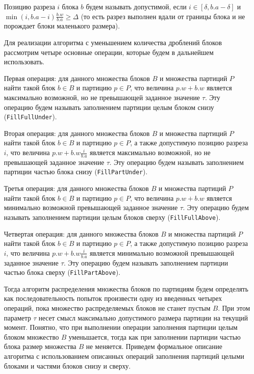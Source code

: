 \begin{definition}
Позицию разреза $i$ блока $b$ будем называть допустимой, если $i \in [\delta, b.a - \delta]$ и $\min(i, b.a - i)\frac{b.w}{b.a} \ge \Delta$ (то есть разрез выполнен вдали от границы блока и не порождает блоки маленького размера).
\end{definition}

Для реализации алгоритма с уменьшением количества дроблений блоков рассмотрим четыре основные операции, которые будем в дальнейшем использовать.

Первая операция: для данного множества блоков $B$ и множества партиций $P$ найти такой блок $b \in B$ и партицию $p \in P$, что величина $p.w + b.w$ является максимально возможной, но не превышающей заданное значение $\tau$.
Эту операцию будем называть заполнением партиции целым блоком снизу (\texttt{FillFullUnder}).

Вторая операция: для данного множества блоков $B$ и множества партиций $P$ найти такой блок $b \in B$ и партицию $p \in P$, а также допустимую позицию разреза $i$, что величина $p.w + b.w \frac{i}{b.a}$ является максимально возможной, но не превышающей заданное значение $\tau$.
Эту операцию будем называть заполнением партиции частью блока снизу (\texttt{FillPartUnder}).

Третья операция: для данного множества блоков $B$ и множества партиций $P$ найти такой блок $b \in B$ и партицию $p \in P$, что величина $p.w + b.w$ является минимально возможной превышающей заданное значение $\tau$.
Эту операцию будем называть заполнением партиции целым блоков сверху (\texttt{FillFullAbove}).

Четвертая операция: для данного множества блоков $B$ и множества партиций $P$ найти такой блок $b \in B$ и партицию $p \in P$, а также допустимую позицию разреза $i$, что величина $p.w + b.w \frac{i}{b.a}$ является минимально возможной превышающей заданное значение $\tau$.
Эту операцию будем называть заполнением партиции частью блока сверху (\texttt{FillPartAbove}).

Тогда алгоритм распределения множества блоков по партициям будем определять как последовательность попыток произвести одну из введенных четырех операций, пока множество распределяемых блоков не станет пустым $B$.
При этом параметр $\tau$ несет смысл максимально допустимого размера партиции на текущий момент.
Понятно, что при выполнении операции заполнения партиции целым блоком множество $B$ уменьшается, тогда как при заполнении партиции частью блока размер множества $B$ не меняется.
Приведем формальное описание алгоритма с использованием описанных операций заполнения партиций целыми блоками и частями блоков снизу и сверху.

